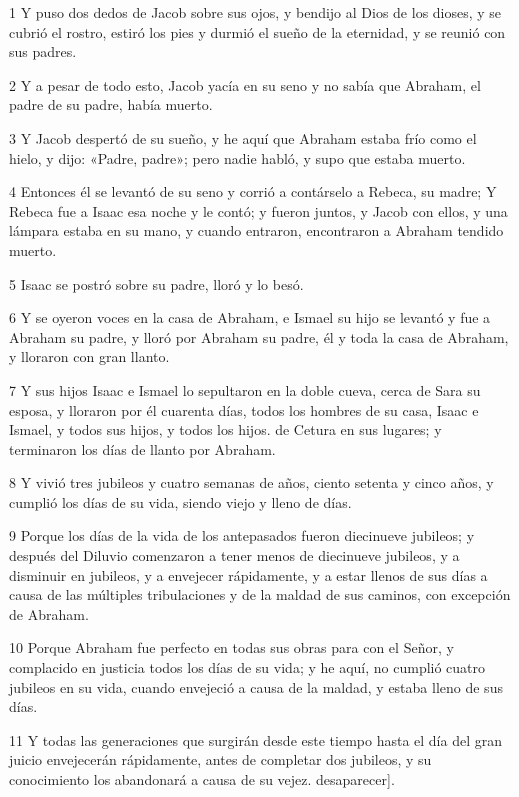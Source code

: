 \par 1 Y puso dos dedos de Jacob sobre sus ojos, y bendijo al Dios de los dioses, y se cubrió el rostro, estiró los pies y durmió el sueño de la eternidad, y se reunió con sus padres.
\par 2 Y a pesar de todo esto, Jacob yacía en su seno y no sabía que Abraham, el padre de su padre, había muerto.
\par 3 Y Jacob despertó de su sueño, y he aquí que Abraham estaba frío como el hielo, y dijo: «Padre, padre»; pero nadie habló, y supo que estaba muerto.
\par 4 Entonces él se levantó de su seno y corrió a contárselo a Rebeca, su madre; Y Rebeca fue a Isaac esa noche y le contó; y fueron juntos, y Jacob con ellos, y una lámpara estaba en su mano, y cuando entraron, encontraron a Abraham tendido muerto.
\par 5 Isaac se postró sobre su padre, lloró y lo besó.
\par 6 Y se oyeron voces en la casa de Abraham, e Ismael su hijo se levantó y fue a Abraham su padre, y lloró por Abraham su padre, él y toda la casa de Abraham, y lloraron con gran llanto.
\par 7 Y sus hijos Isaac e Ismael lo sepultaron en la doble cueva, cerca de Sara su esposa, y lloraron por él cuarenta días, todos los hombres de su casa, Isaac e Ismael, y todos sus hijos, y todos los hijos. de Cetura en sus lugares; y terminaron los días de llanto por Abraham.
\par 8 Y vivió tres jubileos y cuatro semanas de años, ciento setenta y cinco años, y cumplió los días de su vida, siendo viejo y lleno de días.
\par 9 Porque los días de la vida de los antepasados ​​fueron diecinueve jubileos; y después del Diluvio comenzaron a tener menos de diecinueve jubileos, y a disminuir en jubileos, y a envejecer rápidamente, y a estar llenos de sus días a causa de las múltiples tribulaciones y de la maldad de sus caminos, con excepción de Abraham.
\par 10 Porque Abraham fue perfecto en todas sus obras para con el Señor, y complacido en justicia todos los días de su vida; y he aquí, no cumplió cuatro jubileos en su vida, cuando envejeció a causa de la maldad, y estaba lleno de sus días.
\par 11 Y todas las generaciones que surgirán desde este tiempo hasta el día del gran juicio envejecerán rápidamente, antes de completar dos jubileos, y su conocimiento los abandonará a causa de su vejez. desaparecer].
